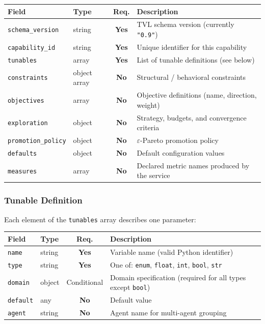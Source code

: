 \documentclass[11pt,a4paper]{article}
\newcommand{\field}[1]{\texttt{#1}}
\newcommand{\required}{\textbf{Yes}}
\newcommand{\optional}{\textbf{No}}
\newcommand{\status}[1]{\texttt{"#1"}}
\begin{document}
\begin{center}\small
\begin{tabularx}{\textwidth}{@{}llcX@{}}
\toprule
\textbf{Field} & \textbf{Type} & \textbf{Req.} & \textbf{Description} \\
\midrule
\field{schema\_version}  & string & \required & TVL schema version (currently \status{0.9}) \\
\field{capability\_id}   & string & \required & Unique identifier for this capability \\
\field{tunables}         & array  & \required & List of tunable definitions (see below) \\
\field{constraints}      & object \textbar{} array & \optional & Structural / behavioral constraints \\
\field{objectives}       & array  & \optional & Objective definitions (name, direction, weight) \\
\field{exploration}      & object & \optional & Strategy, budgets, and convergence criteria \\
\field{promotion\_policy}& object & \optional & $\varepsilon$-Pareto promotion policy \\
\field{defaults}         & object & \optional & Default configuration values \\
\field{measures}         & array  & \optional & Declared metric names produced by the service \\
\bottomrule
\end{tabularx}
\end{center}

\subsubsection{Tunable Definition}

Each element of the \field{tunables} array describes one parameter:

\begin{center}\small
\begin{tabularx}{\textwidth}{@{}llcX@{}}
\toprule
\textbf{Field} & \textbf{Type} & \textbf{Req.} & \textbf{Description} \\
\midrule
\field{name}    & string  & \required      & Variable name (valid Python identifier) \\
\field{type}    & string  & \required      & One of: \texttt{enum}, \texttt{float}, \texttt{int}, \texttt{bool}, \texttt{str} \\
\field{domain}  & object  & Conditional    & Domain specification (required for all types except \texttt{bool}) \\
\field{default} & any     & \optional      & Default value \\
\field{agent}   & string  & \optional      & Agent name for multi-agent grouping \\
\bottomrule
\end{tabularx}
\end{center}
\end{document}
